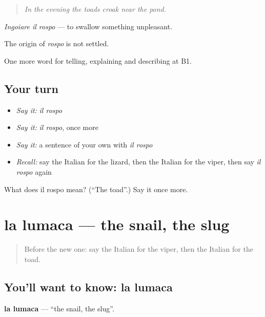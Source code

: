 \begin{quote}
\emph{In the evening the toads croak near the pond.}
\end{quote}

\emph{Ingoiare il rospo} — to swallow something unpleasant.

\begin{cousinweb}
The origin of \emph{rospo} is not settled.
\end{cousinweb}

\begin{grammarlens}[title={What you've built}]
One more word for telling, explaining and describing at B1.
\end{grammarlens}

\subsection*{Your turn}
\begin{itemize}
\raggedright
  \item \emph{Say it:} \emph{il rospo}
  \item \emph{Say it:} \emph{il rospo}, once more
  \item \emph{Say it:} a sentence of your own with \emph{il rospo}
  \item \emph{Recall:} say the Italian for the lizard, then the Italian for the viper, then say \emph{il rospo} again
\end{itemize}

\begin{tcolorbox}[breakable,colback=teal!4,colframe=teal!35!black,title={Before you move on}]
What does il rospo mean? (\textquotedblleft{}The toad\textquotedblright{}.) Say it once more.
\end{tcolorbox}
\section[la lumaca]{la lumaca — the snail, the slug}

\label{lesson:IT-C465-lumaca}



\begin{quote}
Before the new one: say the Italian for the viper, then the Italian for the toad.
\end{quote}

\subsection*{You'll want to know: la lumaca}
\textbf{la lumaca} — \textquotedblleft{}the snail, the slug\textquotedblright{}.

